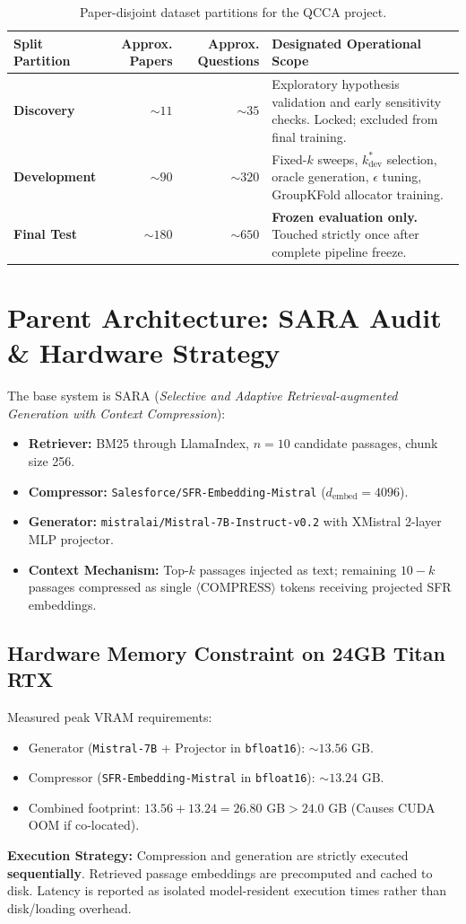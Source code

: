 \documentclass[11pt,a4paper]{article}
\begin{document}
\begin{table}[h]
\centering
\small
\begin{tabularx}{\textwidth}{lrrX}
\toprule
\textbf{Split Partition} & \textbf{Approx. Papers} & \textbf{Approx. Questions} & \textbf{Designated Operational Scope} \\
\midrule
\textbf{Discovery} & $\sim 11$ & $\sim 35$ & Exploratory hypothesis validation and early sensitivity checks. Locked; excluded from final training. \\
\textbf{Development} & $\sim 90$ & $\sim 320$ & Fixed-$k$ sweeps, $k_{\text{dev}}^*$ selection, oracle generation, $\epsilon$ tuning, GroupKFold allocator training. \\
\textbf{Final Test} & $\sim 180$ & $\sim 650$ & \textbf{Frozen evaluation only.} Touched strictly once after complete pipeline freeze. \\
\bottomrule
\end{tabularx}
\caption{Paper-disjoint dataset partitions for the QCCA project.}
\end{table}

\section{Parent Architecture: SARA Audit \& Hardware Strategy}
The base system is SARA (\textit{Selective and Adaptive Retrieval-augmented Generation with Context Compression}):
\begin{itemize}
    \item \textbf{Retriever:} BM25 through LlamaIndex, $n=10$ candidate passages, chunk size 256.
    \item \textbf{Compressor:} \texttt{Salesforce/SFR-Embedding-Mistral} ($d_{\text{embed}} = 4096$).
    \item \textbf{Generator:} \texttt{mistralai/Mistral-7B-Instruct-v0.2} with XMistral 2-layer MLP projector.
    \item \textbf{Context Mechanism:} Top-$k$ passages injected as text; remaining $10-k$ passages compressed as single $\langle\text{COMPRESS}\rangle$ tokens receiving projected SFR embeddings.
\end{itemize}

\subsection{Hardware Memory Constraint on 24GB Titan RTX}
Measured peak VRAM requirements:
\begin{itemize}
    \item Generator (\texttt{Mistral-7B} + Projector in \texttt{bfloat16}): $\sim 13.56\text{ GB}$.
    \item Compressor (\texttt{SFR-Embedding-Mistral} in \texttt{bfloat16}): $\sim 13.24\text{ GB}$.
    \item Combined footprint: $13.56 + 13.24 = 26.80\text{ GB} > 24.0\text{ GB}$ (Causes CUDA OOM if co-located).
\end{itemize}
\textbf{Execution Strategy:} Compression and generation are strictly executed \textbf{sequentially}. Retrieved passage embeddings are precomputed and cached to disk. Latency is reported as isolated model-resident execution times rather than disk/loading overhead.
\end{document}
